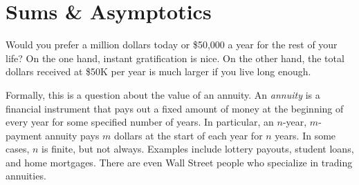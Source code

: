 \chapter{Sums \& Asymptotics}\label{asymptotics_chap}

\label{annuity_sec}

Would you prefer a million dollars today or \$50,000 a year for the
rest of your life?  On the one hand, instant gratification is nice.
On the other hand, the total dollars received at \$50K per year is
much larger if you live long enough.

Formally, this is a question about the value of an annuity.
An {\em annuity} is a financial instrument that pays out a fixed
amount of money at the beginning of every year for some specified
number of years.  In particular, an $n$-year, $m$-payment annuity pays
$m$ dollars at the start of each year for $n$ years.  In some cases,
$n$ is finite, but not always.  Examples include lottery payouts,
student loans, and home mortgages.  There are even Wall Street people
who specialize in trading annuities.

